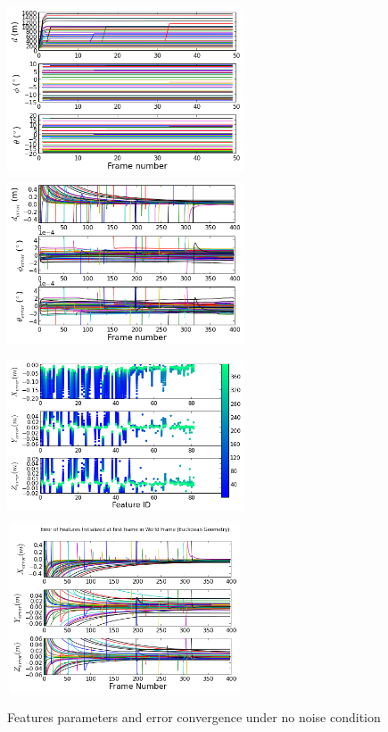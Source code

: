 \begin{figure}[h]
\centering
\includegraphics[width=7cm, height=5cm]{./Figures/SimulationFigures/Figure6.png}
\includegraphics[width=7cm, height=5cm]{./Figures/SimulationFigures/Figure7.png}
\includegraphics[width=7cm, height=5cm]{./Figures/SimulationFigures/Figure5.png}
\includegraphics[width=7cm, height=5cm]{./Figures/SimulationFigures/Figure8.png}
\caption{Features parameters and error convergence under no noise condition}
\label{fig:simfig5-8}
\end{figure}

